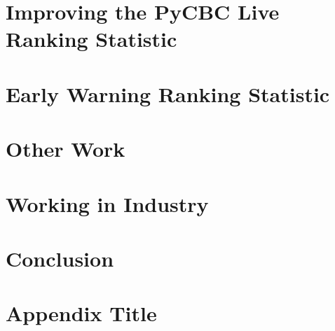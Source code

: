 \documentclass[12pt,twoside]{report} %
\begin{document}
\chapter{Improving the PyCBC Live Ranking Statistic}


\chapter{Early Warning Ranking Statistic}


\chapter{Other Work}


\chapter{Working in Industry}


\chapter{Conclusion}


\appendix
\chapter{Appendix Title}




\end{document}

